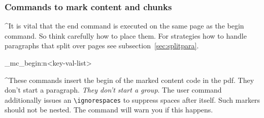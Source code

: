 \documentclass[DIV=12,parskip=half-,bibliography=totoc]{scrartcl}
\begin{document}
\subsubsection{Commands to mark content and chunks}

\TagP^It is vital that the end command is executed on the same page as the begin command. So think carefully how to place them.
For strategies how to handle paragraphs that split over pages see subsection~\ref{sec:splitpara}.\TagPend

\ExplSyntaxOn
\DescribeMacro{}
\DescribeMacro\uftag_mc_begin:n{<key-val-list>}
\ExplSyntaxOff

\TagP^These commands insert the begin of the marked content code in the pdf. They don't start a paragraph. \emph{They don't start a group}. The user command additionally issues an \verb+\ignorespaces+ to suppress spaces after itself.
Such markers should not be nested. The command will warn you if this happens.
\end{document}
